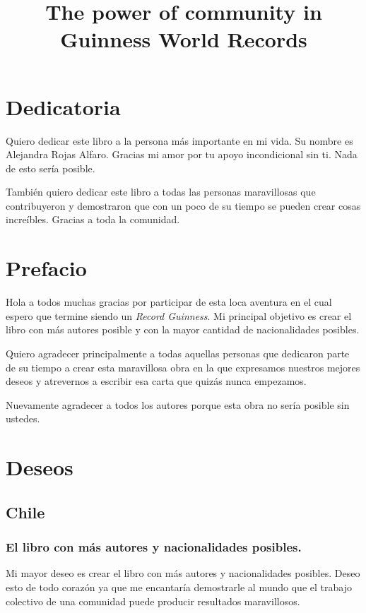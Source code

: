 \documentclass[10pt,letterpaper]{book}
\title{The power of community in Guinness World Records}
\begin{document}
\maketitle

\frontmatter
\chapter*{Dedicatoria}
Quiero dedicar este libro a la persona más importante en mi vida. Su nombre es Alejandra Rojas Alfaro. Gracias mi amor por tu apoyo incondicional sin ti. Nada de esto sería posible.

También quiero dedicar este libro a todas las personas maravillosas que contribuyeron y demostraron que con un poco de su tiempo se pueden crear cosas increíbles. Gracias a toda la comunidad.

\chapter*{Prefacio}
Hola a todos muchas gracias por participar de esta loca aventura en el cual espero que termine siendo un \textit{Record Guinness}. Mi principal objetivo es crear el libro con más autores posible y con la mayor cantidad de nacionalidades posibles. 

Quiero agradecer principalmente a todas aquellas personas que dedicaron parte de su tiempo a crear esta maravillosa obra en la que expresamos nuestros mejores deseos y atrevernos a escribir esa carta que quizás nunca empezamos.

Nuevamente agradecer a todos los autores porque esta obra no sería posible sin ustedes.

\tableofcontents

\mainmatter
\chapter{Deseos}
\section{Chile}

\subsection{El libro con más autores y nacionalidades posibles.}
Mi mayor deseo es crear el libro con más autores y nacionalidades posibles. Deseo esto de todo corazón ya que me encantaría demostrarle al mundo que el trabajo colectivo de una comunidad puede producir resultados maravillosos.
\end{document}
